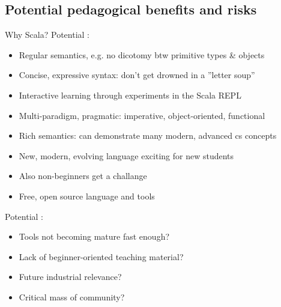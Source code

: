 \documentclass{lecturenotes}
\begin{document}
\subsection[Potential pedagogical benefits and risks]{Potential pedagogical benefits and risks}

\begin{Slide}{Why Scala?}
Potential :
\begin{itemize}\fontsize{9}{10}\selectfont
\item Regular semantics, e.g. no dicotomy btw primitive types \& objects
\item Concise, expressive syntax: don't get drowned in a ''letter soup''
\item Interactive learning through experiments in the Scala REPL
\item Multi-paradigm, pragmatic: imperative, object-oriented, functional
\item Rich semantics: can demonstrate many modern, advanced cs concepts
\item New, modern, evolving language exciting for new students
\item Also non-beginners get a challange 
\item Free, open source language and tools
\end{itemize}
Potential :
\begin{itemize}\fontsize{9}{10}\selectfont
\item Tools not becoming mature fast enough?  
\item Lack of beginner-oriented teaching material?
\item Future industrial relevance? 
\item Critical mass of community?
\end{itemize}
\end{Slide}
\end{document}
